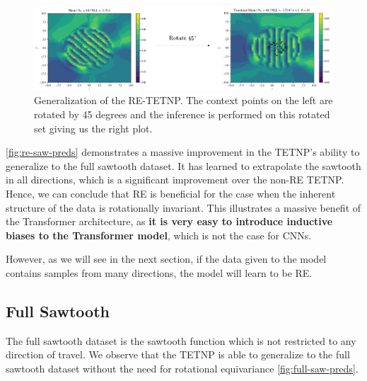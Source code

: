 \documentclass[../../main.tex]{subfiles}
\begin{document}

\begin{figure}[H]
    \centering
    \includegraphics[width=1\linewidth]{./fig/res-saw/re.png}
    \caption{Generalization of the RE-TETNP. The context points on the left are rotated by 45 degrees and  the inference is performed on this rotated set giving us the right plot.}
    \label{fig:re-saw-preds}
\end{figure}

\autoref{fig:re-saw-preds} demonstrates a massive improvement in the TETNP's ability to generalize to the full sawtooth dataset. It has learned to extrapolate the sawtooth in all directions, which is a significant improvement over the non-RE TETNP. Hence, we can conclude that RE is beneficial for the case when the inherent structure of the data is rotationally invariant. This illustrates a massive benefit of the Transformer architecture, as \textbf{it is very easy to introduce inductive biases to the Transformer model}, which is not the case for CNNs.

However, as we will see in the next section, if the data given to the model contains samples from many directions, the model will learn to be RE.

\subsection{Full Sawtooth}

The full sawtooth dataset is the sawtooth function which is not restricted to any direction of travel. We observe that the TETNP is able to generalize to the full sawtooth dataset without the need for rotational equivariance \autoref{fig:full-saw-preds}. 

\end{document}
